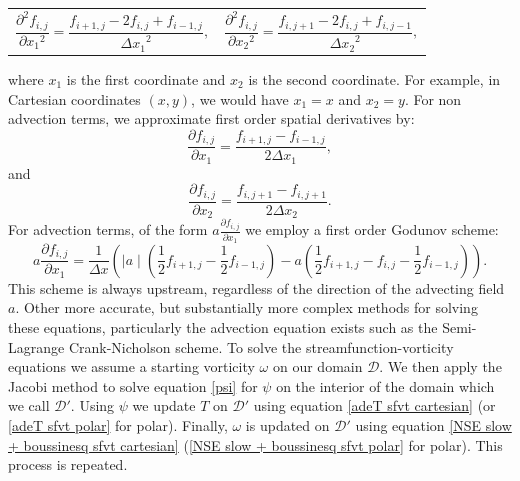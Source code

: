 \documentclass{article}
\begin{document}
\begin{tabularx}{\textwidth}{XX}
\begin{equation}
	\frac{\partial^2 f_{i,j}}{\partial {x_1}^2} = \frac{f_{i+1,j} - 2 f_{i,j} + f_{i-1,j}}{{\Delta x_1}^2},
\end{equation}
    &
\begin{equation}
	\frac{\partial^2 f_{i,j}}{\partial {x_2}^2} = \frac{f_{i,j+1} - 2 f_{i,j} + f_{i,j-1}}{{\Delta x_2}^2},
\end{equation}
\end{tabularx}\par
where $x_1$ is the first coordinate and $x_2$ is the second coordinate. For example, in Cartesian coordinates $(x,y)$, we would have $x_1=x$ and $x_2=y$. 
For non advection terms, we approximate first order spatial derivatives by:
\begin{equation}
	\frac{\partial f_{i,j}}{\partial x_1} = \frac{f_{i+1,j} - f_{i-1,j}}{2{\Delta x_1}},
\end{equation}
and
\begin{equation}
	\frac{\partial f_{i,j}}{\partial x_2} = \frac{f_{i,j+1} - f_{i,j+1}}{2{\Delta x_2}}.
\end{equation}
For advection terms, of the form $a \frac{\partial f_{i,j}}{\partial x_1}$ we employ a first order Godunov scheme:
\begin{equation}
	a \frac{\partial f_{i,j}}{\partial x_1} = \frac{1}{\Delta x} ( \mid a\mid (  \frac{1}{2} f_{i+1,j} - \frac{1}{2} f_{i-1,j}   ) - a ( \frac{1}{2} f_{i+1,j} -f_{i,j} - \frac{1}{2} f_{i-1,j} )).
\end{equation}
This scheme is always upstream, regardless of the direction of the advecting field $a$.
\newline
Other more accurate, but substantially more complex methods for solving these equations, particularly the advection equation exists such as the Semi-Lagrange Crank-Nicholson scheme.
\newline
To solve the streamfunction-vorticity equations we assume a starting vorticity $\omega$ on our domain $\mathcal{D}$. We then apply the Jacobi method to solve equation \ref{psi} for $\psi$ on the interior of the domain which we call $\mathcal{D}'$. 
Using $\psi$ we update $T$ on $\mathcal{D}'$ using equation \ref{adeT sfvt cartesian} (or \ref{adeT sfvt polar} for polar). Finally, $\omega$ is updated on $\mathcal{D}'$ using 
equation \ref{NSE slow + boussinesq sfvt cartesian} (\ref{NSE slow + boussinesq sfvt polar} for polar). This process is repeated.
\end{document}
